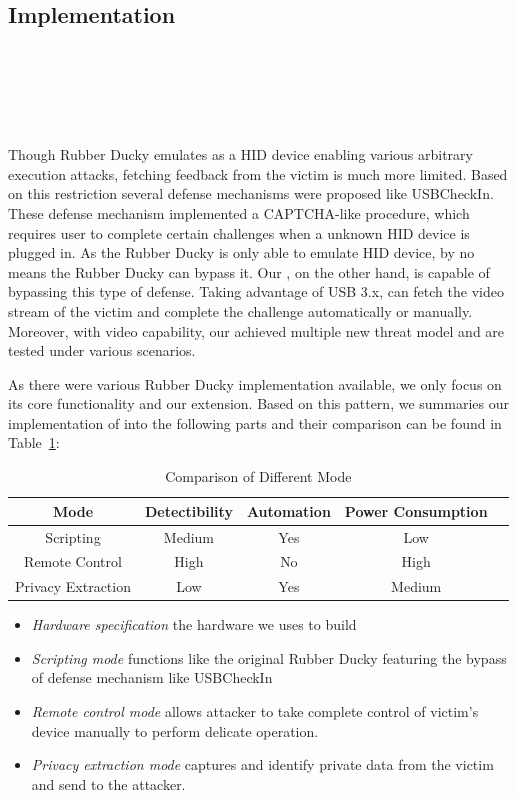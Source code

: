 \subsection{Implementation}
\noindent{}\\
\\
\\
\\
\\
Though Rubber Ducky\cite{rubber} emulates as a HID device enabling various arbitrary execution attacks, fetching feedback from the victim is much more limited. Based on this restriction several defense mechanisms were proposed  like USBCheckIn\cite{usbcheckin}. These defense mechanism implemented a CAPTCHA-like\cite{captcha} procedure, which requires user to complete certain challenges when a unknown HID device is plugged in. As the Rubber Ducky is only able to emulate HID device, by no means the Rubber Ducky can bypass it. Our \tool, on the other hand, is capable of bypassing this type of defense. Taking advantage of USB 3.x\cite{usb31}\cite{usb32}, \tool can fetch the video stream of the victim and complete the challenge automatically or manually. Moreover, with video capability, our \tool achieved multiple new threat model and are tested under various scenarios.

As there were various Rubber Ducky implementation available, we only focus on its core functionality and our extension. Based on this pattern, we summaries our implementation of \tool into the following parts and their comparison can be found in Table~\ref{table:mode_comparison}:
\begin{table}
	\centering
	\begin{tabular}{|c|c|c|c|c|}
	\hline
	Mode & Detectibility & Automation & Power Consumption  \\
	\hline
	Scripting & Medium & Yes & Low\\
	\hline
	Remote Control & High & No & High \\
	\hline
	Privacy Extraction & Low & Yes & Medium\\
	\hline
	\end{tabular}
	\linebreak
	\caption{Comparison of Different Mode}
	\label{table:mode_comparison}
\end{table}
\begin{itemize}
	\item\textit{Hardware specification} the  hardware we uses to build \tool
	\item\textit{Scripting mode} functions like the original Rubber Ducky featuring the bypass of defense mechanism like USBCheckIn\cite{usbcheckin}
	\item \textit{Remote control mode} allows attacker to take complete control of victim's device manually to perform delicate operation.
	\item \textit{Privacy extraction mode} captures and identify private data from the victim and send to the attacker.
\end{itemize}

